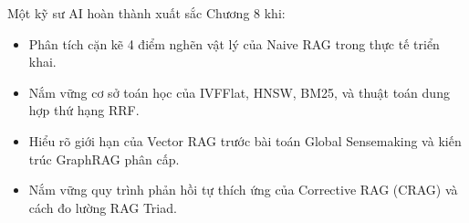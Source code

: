 \begin{checkpointbox}
Một kỹ sư AI hoàn thành xuất sắc Chương 8 khi:
\begin{itemize}
  \item Phân tích cặn kẽ 4 điểm nghẽn vật lý của Naive RAG trong thực tế triển khai.
  \item Nắm vững cơ sở toán học của IVFFlat, HNSW, BM25, và thuật toán dung hợp thứ hạng RRF.
  \item Hiểu rõ giới hạn của Vector RAG trước bài toán Global Sensemaking và kiến trúc GraphRAG phân cấp.
  \item Nắm vững quy trình phản hồi tự thích ứng của Corrective RAG (CRAG) và cách đo lường RAG Triad.
\end{itemize}
\end{checkpointbox}
